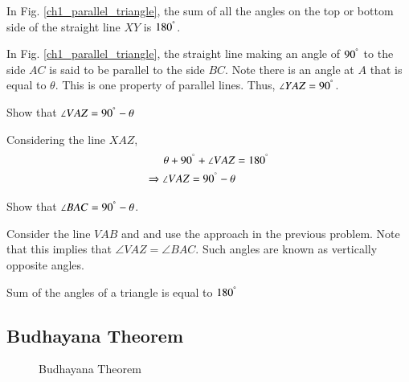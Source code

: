 \begin{definition}
	In Fig. \ref{ch1_parallel_triangle}, the sum of all the angles on the top or bottom side of the straight line $XY$ is $180^{\degree}$.
\end{definition}

\begin{definition}
In Fig. \ref{ch1_parallel_triangle}, the straight line making an angle of $90^{\degree}$ to the side $AC$ is said to be parallel to the side $BC$. Note there is an angle at $A$ that is equal to $\theta$.  This is one property of parallel lines.  Thus, $\angle YAZ = 90^{\degree}$.
\end{definition}

\begin{problem}
	Show that $\angle VAZ = 90^{\degree} - \theta$
\end{problem}		
	\proof Considering the line $XAZ$,
	\begin{align}
	\theta + 90^{\degree} + \angle VAZ &= 180^{\degree} \\
	\Rightarrow  \angle VAZ =  90^{\degree} - \theta
	\end{align}

\begin{problem}
	\label{ch1_compl_angle}
	Show that $\angle BAC = 90^{\degree} - \theta$.
\end{problem}	
	\proof Consider the line $VAB$ and and use the approach in the previous problem.  Note that this implies that $\angle VAZ = \angle BAC$.  Such angles are known as vertically opposite angles. 
	 
\begin{problem}
Sum of the angles of a triangle is equal to $180^{\degree}$
\end{problem}
\subsection{Budhayana Theorem}



\begin{figure}[!h]
	\begin{center}
		
		\resizebox{\columnwidth}{!}{}
	\end{center}
	\caption{Budhayana Theorem}
	\label{ch1_budh_triangle}	
\end{figure}

